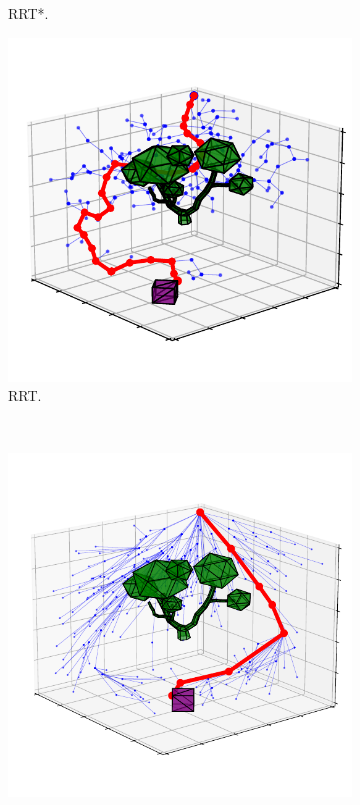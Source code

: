 \documentclass{ctuthesis}
\begin{document}
\begin{figure}[!ht]
\begin{subfigure}[b]{0.45\textwidth}
      \caption{RRT*.}
      \label{fig:rrtstarMaze}
  \end{subfigure}  
  \begin{subfigure}[b]{0.45\textwidth}
      \includegraphics[width=\textwidth]{figChap5/3D_exampleRRT.pdf}
      \caption{RRT.}
      \label{fig:rrt6D} 
  \end{subfigure}
  ~ %
  \begin{subfigure}[b]{0.45\textwidth}
      \includegraphics[width=\textwidth]{figChap5/3D_exampleNew471it_cropped.pdf}

\end{subfigure}
\end{figure}
\end{document}
